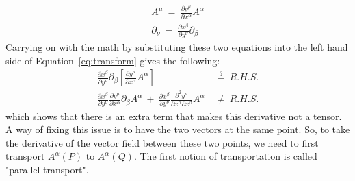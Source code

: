 \begin{gather}
  A^{\mu}\ =\ \frac{\partial y^{\mu}}{\partial x^{\alpha}}A^{\alpha}\\
  \partial_{\nu}\ =\ \frac{\partial x^{\beta}}{\partial y^{\nu}}\partial_{\beta}
\end{gather}
Carrying on with the math by substituting these two equations into the left hand side of Equation~\eqref{eq:transform} gives
the following:
\begin{equation}
  \begin{aligned}
    \frac{\partial x^{\beta}}{\partial y^{\nu}}\partial_{\beta}
    \left[\frac{\partial y^{\mu}}{\partial x^{\alpha}}A^{\alpha}\right] &\stackrel{?}{=}\ \mathit{R.H.S.} \\
    \frac{\partial x^{\beta}}{\partial y^{\nu}}\frac{\partial y^{\mu}}{\partial x^{\alpha}}\partial_{\beta}A^{\alpha}\ +\
    \frac{\partial x^{\beta}}{\partial y^{\nu}}\frac{\partial^2y^{\mu}}{\partial x^{\alpha}\partial x^{\beta}}A^{\alpha}\ 
    &\neq\ \mathit{R.H.S.}
  \end{aligned}
\end{equation}
which shows that there is an extra term that makes this derivative not a tensor.  A way of fixing this issue is to have the
two vectors at the same point.  So, to take the derivative of the vector field between these two points, we need to first
transport $A^{\alpha}(P)$ to $A^{\alpha}(Q)$.  The first notion of transportation is called "parallel transport".
